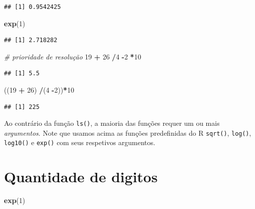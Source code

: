 \documentclass[
]{book}
\newenvironment{Shaded}{\begin{snugshade}}{\end{snugshade}}
\newcommand{\CommentTok}[1]{\textcolor[rgb]{0.56,0.35,0.01}{\textit{#1}}}
\newcommand{\DecValTok}[1]{\textcolor[rgb]{0.00,0.00,0.81}{#1}}
\newcommand{\FunctionTok}[1]{\textcolor[rgb]{0.13,0.29,0.53}{\textbf{#1}}}
\newcommand{\NormalTok}[1]{#1}
\newcommand{\SpecialCharTok}[1]{\textcolor[rgb]{0.81,0.36,0.00}{\textbf{#1}}}
\begin{document}
\begin{verbatim}
## [1] 0.9542425
\end{verbatim}

\begin{Shaded}
\begin{Highlighting}[]
\FunctionTok{exp}\NormalTok{(}\DecValTok{1}\NormalTok{)}
\end{Highlighting}
\end{Shaded}

\begin{verbatim}
## [1] 2.718282
\end{verbatim}

\begin{Shaded}
\begin{Highlighting}[]
\CommentTok{\# prioridade de resolução}
\DecValTok{19} \SpecialCharTok{+} \DecValTok{26} \SpecialCharTok{/}\DecValTok{4} \SpecialCharTok{{-}}\DecValTok{2} \SpecialCharTok{*}\DecValTok{10}
\end{Highlighting}
\end{Shaded}

\begin{verbatim}
## [1] 5.5
\end{verbatim}

\begin{Shaded}
\begin{Highlighting}[]
\NormalTok{((}\DecValTok{19} \SpecialCharTok{+} \DecValTok{26}\NormalTok{) }\SpecialCharTok{/}\NormalTok{(}\DecValTok{4} \SpecialCharTok{{-}}\DecValTok{2}\NormalTok{))}\SpecialCharTok{*}\DecValTok{10}
\end{Highlighting}
\end{Shaded}

\begin{verbatim}
## [1] 225
\end{verbatim}

Ao contrário da função \texttt{ls()}, a maioria das funções requer um ou mais \emph{argumentos}. Note que usamos acima as funções predefinidas do R \texttt{sqrt()}, \texttt{log()}, \texttt{log10()} e \texttt{exp()} com seus respetivos argumentos.

\section{Quantidade de digitos}\label{quantidade-de-digitos}

\begin{Shaded}
\begin{Highlighting}[]
\FunctionTok{exp}\NormalTok{(}\DecValTok{1}\NormalTok{)}
\end{Highlighting}
\end{Shaded}
\end{document}
